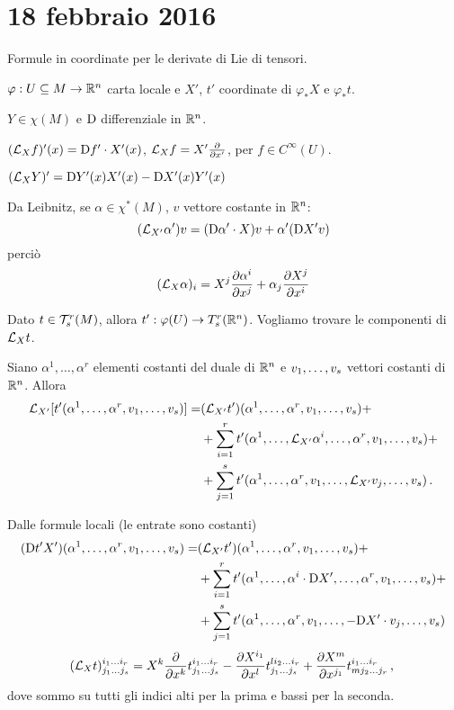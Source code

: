 \chapter{18 febbraio 2016}

Formule in coordinate per le derivate di Lie di tensori.

$\varphi:U\subseteq M \to \R^n$ carta locale e $X'$, $t'$ coordinate di $\varphi_*X$ e $\varphi_*t$.

$Y\in\chi(M)$ e $\Diff$ differenziale in $\R^n$.

$(\Lie_Xf)'(x) = \Diff f'\cdot X'(x)$, $\Lie_X f = X'\DerParz{}{x'}$, per $f\in C^\infty(U)$.

$(\Lie_XY)' = \Diff Y'(x) X'(x) -\Diff X'(x) Y'(x)$

Da Leibnitz, se $\alpha\in\chi^*(M)$, $v$ vettore costante in $\R^n$:
\begin{equation*}
	(\Lie_{X'}\alpha')v = (\Diff \alpha'\cdot X) v + \alpha' (\Diff X' v)
\end{equation*}
perciò
\begin{equation*}
	(\Lie_X\alpha)_i = X^j \DerParz{\alpha^i}{x^j} + \alpha_j \DerParz{X^j}{x^i}
\end{equation*}

Dato $t\in\Tau_s^r(M)$, allora $t':\varphi(U)\to T_s^r(\R^n)$.
Vogliamo trovare le componenti di $\Lie_Xt$.

Siano $\alpha^1,\ldots,\alpha^r$ elementi costanti del duale di $\R^n$ e $\seq{v}{s}{,}$ vettori costanti di $\R^n$. Allora
\begin{align*}
	\Lie_{X'}[t'(\alpha^1,\ldots,\alpha^r,\seq{v}{s}{,})] =& (\Lie_{X'}t')(\alpha^1,\ldots,\alpha^r,\seq{v}{s}{,}) +\\
	&+\sum_{i=1}^r t'(\alpha^1,\ldots, \Lie_{X'}\alpha^i,\ldots, \alpha^r, \seq{v}{s}{,}) +\\
	&+\sum_{j=1}^s t'(\alpha^1,\ldots,\alpha^r,v_1,\ldots,\Lie_{X'}v_j,\ldots,v_s) \punto
\end{align*}

Dalle formule locali (le entrate sono costanti)
\begin{align*}
	(\Diff t'X') (\seqa{\alpha}{r}{,}, \seqb{v}{s}{,}) =& (\Lie_{X'}t')(\seqa{\alpha}{r}{,}, \seqb{v}{s}{,})+\\ 
	&+ \sum_{i=1}^r t'(\alpha^1,\ldots, \alpha^i\cdot\Diff X',\ldots, \alpha^r, \seq{v}{s}{,}) +\\
	&+\sum_{j=1}^s t'(\alpha^1,\ldots,\alpha^r,v_1,\ldots,-\Diff X'\cdot v_j,\ldots,v_s)
\end{align*}
\begin{equation*}
	(\Lie_Xt)_{\seqb{j}{s}{}}^{\seqb{i}{r}{}} = X^k \DerParz{}{x^k} t_{\seqb{j}{s}{}}^{\seqb{i}{r}{}} - \DerParz{X^{i_1}}{x^l} t_{\seqb{j}{s}{}}^{li_2\ldots i_r} + \DerParz{X^m}{x^{j_1}} t^{\seqb{i}{r}{}}_{mj_2\ldots j_r} \virgola
\end{equation*}
dove sommo su tutti gli indici alti per la prima e bassi per la seconda.

